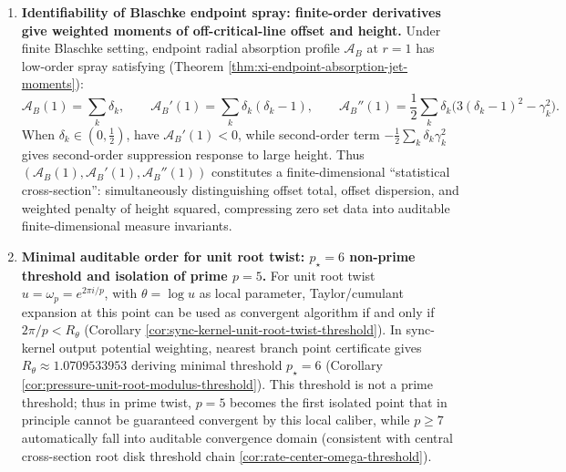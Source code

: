 \begin{enumerate}
  \item \textbf{Identifiability of Blaschke endpoint spray: finite-order derivatives give weighted moments of off-critical-line offset and height.}
  Under finite Blaschke setting, endpoint radial absorption profile \(\mathcal{A}_B\) at \(r=1\) has low-order spray satisfying (Theorem \ref{thm:xi-endpoint-absorption-jet-moments}):
  \[
  \mathcal{A}_B(1)=\sum_k \delta_k,\qquad
  \mathcal{A}_B'(1)=\sum_k \delta_k(\delta_k-1),\qquad
  \mathcal{A}_B''(1)=\frac12\sum_k \delta_k\bigl(3(\delta_k-1)^2-\gamma_k^2\bigr).
  \]
  When \(\delta_k\in(0,\tfrac12)\), have \(\mathcal{A}_B'(1)<0\), while second-order term \(-\tfrac12\sum_k\delta_k\gamma_k^2\) gives second-order suppression response to large height.
  Thus \((\mathcal{A}_B(1),\mathcal{A}_B'(1),\mathcal{A}_B''(1))\) constitutes a finite-dimensional ``statistical cross-section'': simultaneously distinguishing offset total, offset dispersion, and weighted penalty of height squared, compressing zero set data into auditable finite-dimensional measure invariants.

  \item \textbf{Minimal auditable order for unit root twist: \texorpdfstring{$p_\star=6$}{p*=6} non-prime threshold and isolation of prime \texorpdfstring{$p=5$}{p=5}.}
  For unit root twist \(u=\omega_p=e^{2\pi i/p}\), with \(\theta=\log u\) as local parameter, Taylor/cumulant expansion at this point can be used as convergent algorithm if and only if \(2\pi/p<R_\theta\) (Corollary \ref{cor:sync-kernel-unit-root-twist-threshold}).
  In sync-kernel output potential weighting, nearest branch point certificate gives \(R_\theta\approx 1.0709533953\) deriving minimal threshold \(p_\star=6\) (Corollary \ref{cor:pressure-unit-root-modulus-threshold}).
  This threshold is not a prime threshold; thus in prime twist, \(p=5\) becomes the first isolated point that in principle cannot be guaranteed convergent by this local caliber, while \(p\ge 7\) automatically fall into auditable convergence domain (consistent with central cross-section root disk threshold chain \ref{cor:rate-center-omega-threshold}).
\end{enumerate}

